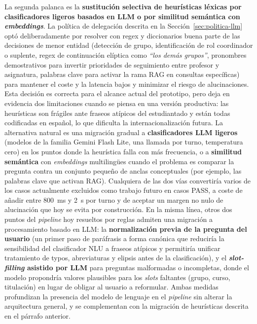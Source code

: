 La segunda palanca es la \textbf{sustitución selectiva de heurísticas léxicas por clasificadores ligeros basados en LLM o por similitud semántica con \textit{embeddings}}. La política de delegación descrita en la Sección~\ref{sec:politica-llm} optó deliberadamente por resolver con regex y diccionarios buena parte de las decisiones de menor entidad (detección de grupo, identificación de rol coordinador o suplente, regex de continuación elíptica como \textit{``los demás grupos''}, pronombres demostrativos para invertir prioridades de seguimiento entre profesor y asignatura, palabras clave para activar la rama RAG en consultas específicas) para mantener el coste y la latencia bajos y minimizar el riesgo de alucinaciones. Esta decisión es correcta para el alcance actual del prototipo, pero deja en evidencia dos limitaciones cuando se piensa en una versión productiva: las heurísticas son frágiles ante fraseos atípicos del estudiantado y están todas codificadas en español, lo que dificulta la internacionalización futura. La alternativa natural es una migración gradual a \textbf{clasificadores LLM ligeros} (modelos de la familia Gemini Flash Lite, una llamada por turno, temperatura cero) en los puntos donde la heurística falla con más frecuencia, o a \textbf{similitud semántica} con \textit{embeddings} multilingües cuando el problema es comparar la pregunta contra un conjunto pequeño de anclas conceptuales (por ejemplo, las palabras clave que activan RAG). Cualquiera de las dos vías convertiría varios de los casos actualmente excluidos como trabajo futuro en casos PASS, a coste de añadir entre 800~ms y 2~s por turno y de aceptar un margen no nulo de alucinación que hoy se evita por construcción. En la misma línea, otros dos puntos del \textit{pipeline} hoy resueltos por reglas admiten una migración a procesamiento basado en LLM: la \textbf{normalización previa de la pregunta del usuario} (un primer paso de paráfrasis a forma canónica que reduciría la sensibilidad del clasificador NLU a fraseos atípicos y permitiría unificar tratamiento de typos, abreviaturas y elipsis antes de la clasificación), y el \textbf{\textit{slot-filling} asistido por LLM} para preguntas malformadas o incompletas, donde el modelo propondría valores plausibles para los \textit{slots} faltantes (grupo, curso, titulación) en lugar de obligar al usuario a reformular. Ambas medidas profundizan la presencia del modelo de lenguaje en el \textit{pipeline} sin alterar la arquitectura general, y se complementan con la migración de heurísticas descrita en el párrafo anterior.

